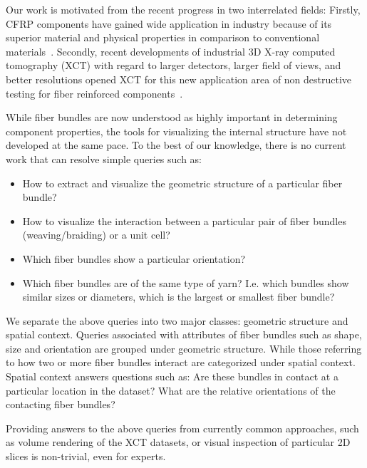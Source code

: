 Our work is motivated from the recent progress in two interrelated fields: Firstly, CFRP components have gained wide application in industry because of its superior material and physical properties in comparison to conventional materials~\cite{Karpat2012}. Secondly, recent developments of industrial 3D X-ray computed tomography (XCT) with regard to larger detectors, larger field of views, and better resolutions opened XCT for this new application area of non destructive testing for fiber reinforced components~\cite{Schilling2005}. 

While fiber bundles are now understood as highly important in determining component properties, the tools for visualizing the internal structure have not developed at the same pace.
To the best of our knowledge, there is no current work that can resolve simple queries such as:
\begin{itemize}[noitemsep]
	\item{ How to extract and visualize the geometric structure of a particular fiber bundle?}
	\item{ How to visualize the interaction between a particular pair of fiber bundles (weaving/braiding) or a unit cell?}
	\item{ Which fiber bundles show a particular orientation? }
	\item{ Which fiber bundles are of the same type of yarn? I.e. which bundles show similar sizes or diameters, which is the largest or smallest fiber bundle?}
\end{itemize}
{We separate the above queries into two major classes: geometric structure and spatial context. 
Queries associated with attributes of fiber bundles such as shape, size and orientation are grouped under geometric structure. While those referring to how two or more fiber bundles interact are categorized under spatial context. Spatial context answers questions such as: Are these bundles in contact at a particular location in the dataset? What are the relative orientations of the contacting fiber bundles?

Providing answers to the above queries from currently common approaches, such as volume rendering of the XCT datasets, or  visual inspection of particular 2D slices is non-trivial, even for experts.}

